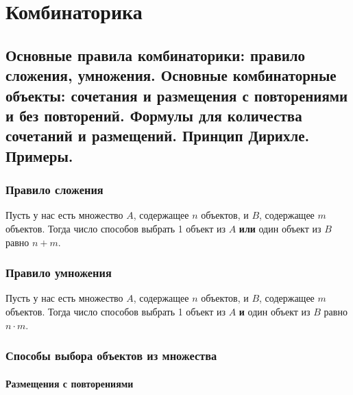 \chapter{Комбинаторика}

%

\begin{multicols}{2}
    \raggedcolumns
    \section{Основные правила комбинаторики: правило сложения, умножения. Основные
    комбинаторные объекты: сочетания и размещения с повторениями и без повторений.
    Формулы для количества сочетаний и размещений. Принцип Дирихле. Примеры.}
      \subsection*{Правило сложения}

      \begin{proposition}{}{}
        Пусть у нас есть множество $A$, содержащее $n$ объектов, и $B$, содержащее $m$ объектов. Тогда число способов выбрать 1 объект из $A$ \textbf{или} один объект из $B$ равно $n + m$.
      \end{proposition}

      \subsection*{Правило умножения}

      \begin{proposition}{}{}
        Пусть у нас есть множество $A$, содержащее $n$ объектов, и $B$, содержащее $m$ объектов. Тогда число способов выбрать 1 объект из $A$ \textbf{и} один объект из $B$ равно $n \cdot m$.
      \end{proposition}

      \subsection*{Способы выбора объектов из множества}

      \subsubsection*{Размещения с повторениями}


\end{multicols}
